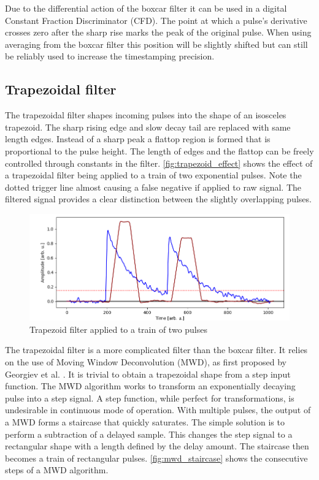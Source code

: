 Due to the differential action of the boxcar filter it can be used in a
digital Constant Fraction Discriminator (CFD).
The point at which a pulse's derivative crosses zero after 
the sharp rise marks the peak of the original pulse. 
When using averaging from the boxcar filter this position 
will be slightly shifted but can still be reliably used to increase
the timestamping precision.

\subsection{Trapezoidal filter}

The trapezoidal filter shapes incoming pulses into the 
shape of an isosceles trapezoid. The sharp rising edge and 
slow decay tail are replaced with same length edges.
Instead of a sharp peak a flattop region is formed that is proportional
to the pulse height. The length of edges and the flattop can be freely
controlled through constants in the filter. \autoref{fig:trapezoid_effect}
shows the effect of a trapezoidal filter being applied to a train
of two exponential pulses. Note the dotted trigger line almost 
causing a false negative if applied to raw signal. 
The filtered signal provides a clear distinction 
between the slightly overlapping pulses.

\begin{figure}[H]
  \centering
  \includegraphics[width=\linewidth]{media/trapezoid_effect.png}
  \caption{Trapezoid filter applied to a train of two pulses}
  \label{fig:trapezoid_effect} 
\end{figure}


The trapezoidal filter is a more complicated filter than the boxcar filter.
It relies on the use of Moving Window Deconvolution (MWD),
as first proposed by Georgiev et al. \cite{mwd}.
It is trivial to obtain a trapezoidal shape from a step input function.
The MWD algorithm works to transform an exponentially decaying pulse into 
a step signal. A step function, while perfect for transformations,
is undesirable in continuous mode of operation.
With multiple pulses, the output of a MWD forms a staircase that quickly saturates.
The simple solution is to perform a subtraction of a delayed sample.
This changes the step signal
to a rectangular shape with a length defined by the delay amount.
The staircase then becomes a train of rectangular pulses.
\autoref{fig:mwd_staircase} shows the consecutive steps of a MWD algorithm.

